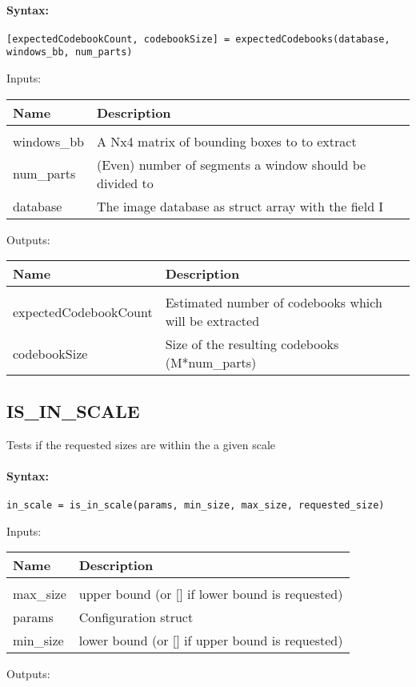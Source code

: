 \paragraph{Syntax:} \verb|[expectedCodebookCount, codebookSize] = expectedCodebooks(database, windows_bb, num_parts)|

Inputs:

\begin{tabular}{|l|p{5cm}|}
\hline
\textbf{Name} & \textbf{Description} \\
\hline \hline \\
windows\_bb & A Nx4 matrix of bounding boxes to to extract  \\ \hline
num\_parts & (Even) number of segments a window should be divided to  \\ \hline
database & The image database as struct array with the field I  \\ \hline
\end{tabular}
Outputs:

\begin{tabular}{|l|p{5cm}|}
\hline
\textbf{Name} & \textbf{Description} \\
\hline \hline \\
expectedCodebookCount & Estimated number of codebooks which will be extracted  \\ \hline
codebookSize & Size of the resulting codebooks (M*num\_parts)  \\ \hline
\end{tabular}

\subsection{IS\_IN\_SCALE}

Tests if the requested sizes are within the a given scale

\paragraph{Syntax:} \verb|in_scale = is_in_scale(params, min_size, max_size, requested_size)|

Inputs:

\begin{tabular}{|l|p{5cm}|}
\hline
\textbf{Name} & \textbf{Description} \\
\hline \hline \\
max\_size & upper bound (or [] if lower bound is requested)  \\ \hline
params & Configuration struct  \\ \hline
min\_size & lower bound (or [] if upper bound is requested)  \\ \hline
\end{tabular}
Outputs:

